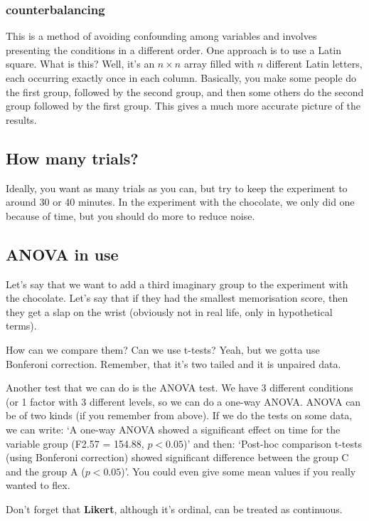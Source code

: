 \documentclass[11pt,a4paper,titlepage]{scrartcl}
\begin{document}
\subsubsection{counterbalancing}%
\label{ssub:counterbalancing}
This is a method of avoiding confounding among variables and involves
presenting the conditions in a different order. One approach is to use a
Latin square. What is this? Well, it's an $n \times n$ array filled with
$n$ different Latin letters, each occurring exactly once in each column.
Basically, you make some people do the first group, followed by the second
group, and then some others do the second group followed by the first
group. This gives a much more accurate picture of the results.

\subsection{How many trials?}%
\label{sub:trials}
Ideally, you want as many trials as you can, but try to keep the
experiment to around 30 or 40 minutes. In the experiment with the
chocolate, we only did one because of time, but you should do more to
reduce noise. 

\subsection{ANOVA in use}%
\label{sec:anova-usage}

Let's say that we want to add a third imaginary group to the experiment
with the chocolate. Let's say that if they had the smallest memorisation
score, then they get a slap on the wrist (obviously not in real life, only
in hypothetical terms). 

How can we compare them? Can we use t-tests? Yeah, but we gotta use
Bonferoni correction. Remember, that it's two tailed and it is unpaired
data.

Another test that we can do is the ANOVA test. We have 3 different
conditions (or 1 factor with 3 different levels, so we can do a one-way
ANOVA. ANOVA can be of two kinds (if you remember from above). If we do
the tests on some data, we can write: `A one-way ANOVA showed a
significant effect on time for the variable group (F2.57 = 154.88, $p <
0.05$)' and then: `Post-hoc comparison t-tests (using Bonferoni correction)
showed significant difference between the group C and the group A
($p<0.05$)'. You could even give some mean values if you really wanted to
flex.

Don't forget that \textbf{Likert}, although it's ordinal, can be treated
as continuous.
\end{document}

